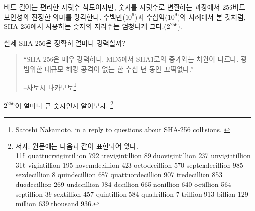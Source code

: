 \begin{comment}
	While bit length is a convenient metric, the true meaning of 256-bit
	security is lost in translation. Similar to the millions ($10^6$) and
	billions ($10^9$) above, the number in SHA-256 is about orders of magnitude
	($2^{256}$).
\end{comment}
비트 길이는 편리한 자릿수 척도이지만, 숫자를 자릿수로 변환하는 과정에서 256비트 보안성의 진정한 의미를 망각한다.
수백만($10^6$)과 수십억($10^9$)의 사례에서 본 것처럼, SHA-256에서 사용하는 숫자의 자리수는 엄청나게 크다.($2^{256}$).
\begin{comment}
	So, how strong is SHA-256, exactly?
\end{comment}
실제 SHA-256은 정확히 얼마나 강력할까?
\begin{comment}
	\begin{quotation}\begin{samepage}
			\enquote{SHA-256 is very strong. It's not like the incremental step from MD5
				to SHA1. It can last several decades unless there's some massive
				breakthrough attack.}
			\begin{flushright} -- Satoshi Nakamoto\footnote{Satoshi Nakamoto, in a reply to questions about SHA-256 collisions. \cite{satoshi-sha256}}
	\end{flushright}\end{samepage}\end{quotation}
\end{comment}
\begin{quotation}\begin{samepage}
		\enquote{SHA-256은 매우 강력하다. MD5에서 SHA1로의 증가와는 차원이 다르다.
			광범위한 대규모 해킹 공격이 없는 한 수십 년 동안 끄떡없다.}
		\begin{flushright} --사토시 나카모토\footnote{Satoshi Nakamoto, in a reply to questions about SHA-256 collisions. \cite{satoshi-sha256}}
\end{flushright}\end{samepage}\end{quotation}


$2^{256}$이 얼마나 큰 숫자인지 알아보자.
\footnote{
	저자: 원문에는 다음과 같이 표현되어 있다. \\
	115 quattuorvigintillion 792 trevigintillion 89 duovigintillion 237
	unvigintillion 316 vigintillion 195 novemdecillion 423 octodecillion 570
	septendecillion 985 sexdecillion 8 quindecillion 687 quattuordecillion 907
	tredecillion 853 duodecillion 269 undecillion 984 decillion 665 nonillion
	640 octillion 564 septillion 39 sextillion 457 quintillion 584 quadrillion 7
	trillion 913 billion 129 million 639 thousand 936.}

